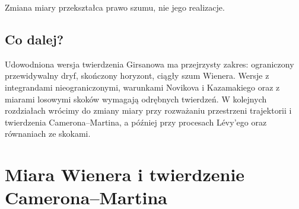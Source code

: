 \documentclass[11pt,a4paper,oneside]{report}
\numberwithin{equation}{chapter}
\theoremstyle{plain}
\theoremstyle{definition}
\theoremstyle{remark}
\newcommand{\Prob}{\mathbb{P}}
\newcommand{\dd}{\mathrm{d}}
\begin{document}
\begin{center}
\par\smallskip\small Zmiana miary przekształca prawo szumu, nie jego realizacje.
\end{center}

\section{Co dalej?}\label{sec:volIII:08:06}
Udowodniona wersja twierdzenia Girsanowa ma przejrzysty
zakres: ograniczony przewidywalny dryf, skończony horyzont,
ciągły szum Wienera. Wersje z integrandami nieograniczonymi,
warunkami Novikova i Kazamakiego oraz z miarami losowymi
skoków wymagają odrębnych twierdzeń.
W kolejnych rozdziałach wrócimy do zmiany miary przy
rozważaniu przestrzeni trajektorii i twierdzenia
Camerona--Martina, a później przy procesach Lévy'ego
oraz równaniach ze skokami.

\chapter{Miara Wienera i twierdzenie Camerona--Martina}
\label{chap:volIII:09}
\par\smallskip{}\par\smallskip

\label{ch:cameron-martin}
\end{document}
